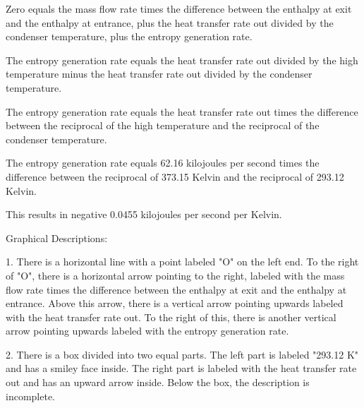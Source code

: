 Zero equals the mass flow rate times the difference between the enthalpy at exit and the enthalpy at entrance, plus the heat transfer rate out divided by the condenser temperature, plus the entropy generation rate.

The entropy generation rate equals the heat transfer rate out divided by the high temperature minus the heat transfer rate out divided by the condenser temperature.

The entropy generation rate equals the heat transfer rate out times the difference between the reciprocal of the high temperature and the reciprocal of the condenser temperature.

The entropy generation rate equals 62.16 kilojoules per second times the difference between the reciprocal of 373.15 Kelvin and the reciprocal of 293.12 Kelvin.

This results in negative 0.0455 kilojoules per second per Kelvin.

Graphical Descriptions:

1. There is a horizontal line with a point labeled "O" on the left end. To the right of "O", there is a horizontal arrow pointing to the right, labeled with the mass flow rate times the difference between the enthalpy at exit and the enthalpy at entrance. Above this arrow, there is a vertical arrow pointing upwards labeled with the heat transfer rate out. To the right of this, there is another vertical arrow pointing upwards labeled with the entropy generation rate.

2. There is a box divided into two equal parts. The left part is labeled "293.12 K" and has a smiley face inside. The right part is labeled with the heat transfer rate out and has an upward arrow inside. Below the box, the description is incomplete.
